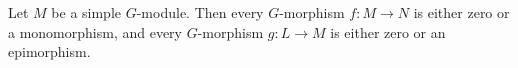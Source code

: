 Let $M$ be a simple $G$-module. Then every $G$-morphism $f: M \rightarrow N$ is either zero or a monomorphism, and every $G$-morphism $g: L \rightarrow M$ is either zero or an epimorphism.
